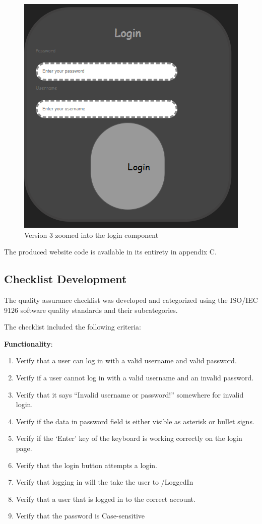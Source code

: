 \documentclass[journal,twocolumn]{IEEEtran}
\begin{document}
\begin{figure}[H]
    \centering
    \includegraphics[width=0.6\linewidth]{V3 zoomed in.png}
    \caption{Version 3 zoomed into the login component}
    \label{v3-zoom}
\end{figure}

The produced website code is available in its entirety in appendix C.

\subsection{Checklist Development}
The quality assurance checklist was developed and categorized using the ISO/IEC 9126 software quality standards and their subcategories.

The checklist included the following criteria:

\textbf{Functionality}:
\begin{enumerate}[label=1.\arabic*]
    \item Verify that a user can log in with a valid username and valid password.
    \item Verify if a user cannot log in with a valid username and an invalid password.
    \item Verify that it says “Invalid username or password!” somewhere for invalid login.
    \item Verify if the data in password field is either visible as asterisk or bullet signs.
    \item Verify if the ‘Enter’ key of the keyboard is working correctly on the login page.
    \item Verify that the login button attempts a login.
    \item Verify that logging in will the take the user to /LoggedIn
    \item Verify that a user that is logged in to the correct account.
    \item Verify that the password is Case-sensitive
\end{enumerate}
\end{document}
